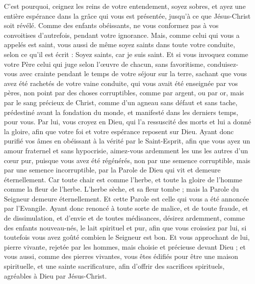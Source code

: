 \begin{multicols}{2}
C'est pourquoi, ceignez les reins de votre entendement, soyez sobres, et ayez une entière espérance dans la grâce qui vous est présentée, jusqu'à ce que Jésus-Christ soit révélé.
Comme des enfants obéissants, ne vous conformez pas à vos convoitises d'autrefois, pendant votre ignorance. 
Mais, comme celui qui vous a appelés est saint, vous aussi de même soyez saints dans toute votre conduite,
selon ce qu'il est écrit : Soyez saints, car je suis saint.
Et si vous invoquez comme votre Père celui qui juge selon l'œuvre de chacun, sans favoritisme, conduisez-vous avec crainte pendant le temps de votre séjour sur la terre,
sachant que vous avez été rachetés de votre vaine conduite, qui vous avait été enseignée par vos pères, non point par des choses corruptibles, comme par argent, ou par or,
mais par le sang précieux de Christ, comme d'un agneau sans défaut et sans tache,
prédestiné avant la fondation du monde, et manifesté dans les derniers temps, pour vous.
Par lui, vous croyez en Dieu, qui l'a ressuscité des morts et lui a donné la gloire, afin que votre foi et votre espérance reposent sur Dieu.
Ayant donc purifié vos âmes en obéissant à la vérité par le Saint-Esprit, afin que vous ayez un amour fraternel et sans hypocrisie, aimez-vous ardemment les uns les autres d'un cœur pur,
puisque vous avez été régénérés, non par une semence corruptible, mais par une semence incorruptible, par la Parole de Dieu qui vit et demeure éternellement.
Car toute chair est comme l'herbe, et toute la gloire de l'homme comme la fleur de l'herbe. L'herbe sèche, et sa fleur tombe ;
mais la Parole du Seigneur demeure éternellement. Et cette Parole est celle qui vous a été annoncée par l'Evangile.
\VerseOne{}Ayant donc renoncé à toute sorte de malice, et de toute fraude, et de dissimulation, et d'envie et de toutes médisances,
désirez ardemment, comme des enfants nouveau-nés, le lait spirituel et pur, afin que vous croissiez par lui,
si toutefois vous avez goûté combien le Seigneur est bon.
Et vous approchant de lui, pierre vivante, rejetée par les hommes, mais choisie et précieuse devant Dieu ;
et vous aussi, comme des pierres vivantes, vous êtes édifiés pour être une maison spirituelle, et une sainte sacrificature, afin d'offrir des sacrifices spirituels, agréables à Dieu par Jésus-Christ. 

\end{multicols}
